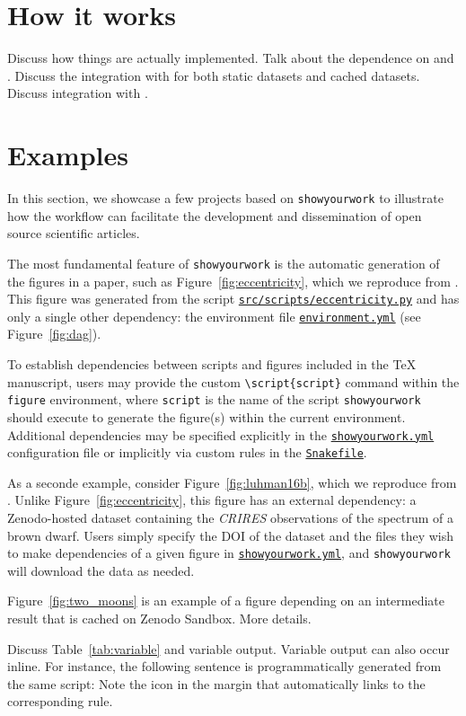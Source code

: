 \documentclass{aastex631}
\newcommand\xxx[1]{{\color{red}#1}}
\newcommand\syw{\texttt{showyourwork}\xspace}
\newcommand\repoargurl{https://github.com/showyourwork/showyourwork-paper}
\newcommand\fileurl[1]{\repoargurl/blob/\GitHubSHA/#1}
\newcommand\repoargfile[1]{\href{\fileurl{#1}}{\texttt{#1}\xspace}}
\newcommand\figenv{\texttt{figure}\xspace}
\newcommand\scriptcmd{\texttt{\textbackslash script\{{\color{lsthilite}script}\}}\xspace}
\newcommand\scriptarg{\texttt{\color{lsthilite}script}\xspace}
\begin{document}
\section{How it works}
\label{sec:how-it-works}
\xxx{Discuss how things are actually implemented. Talk about the dependence on \snakemake \citep{Molder2021} and \tectonic. Discuss the integration with \Zenodo for both static datasets and cached datasets. Discuss integration with \Overleaf.}

\section{Examples}
\label{sec:examples}
In this section, we showcase a few projects based on \syw to illustrate how the workflow can facilitate the development and dissemination of open source scientific articles.

The most fundamental feature of \syw is the automatic generation of the figures in a paper, such as Figure~\ref{fig:eccentricity}, which we reproduce from \citet{Wagg2022}.
This figure was generated from the script \repoargfile{src/scripts/eccentricity.py} and has only a single other dependency: the \conda environment file \repoargfile{environment.yml} (see Figure~\ref{fig:dag}).

To establish dependencies between scripts and figures included in the TeX manuscript, users may provide the custom \scriptcmd command within the \figenv environment, where \scriptarg is the name of the script \syw should execute to generate the figure(s) within the current environment.
Additional dependencies may be specified explicitly in the \repoargfile{showyourwork.yml} configuration file or implicitly via custom rules in the \repoargfile{Snakefile}.

As a seconde example, consider Figure~\ref{fig:luhman16b}, which we reproduce from \citet{Luger2021c}. 
Unlike Figure~\ref{fig:eccentricity}, this figure has an external dependency: a Zenodo-hosted dataset containing the \emph{CRIRES} observations of the spectrum of a brown dwarf.
Users simply specify the DOI of the dataset and the files they wish to make dependencies of a given figure in \repoargfile{showyourwork.yml}, and \syw will download the data as needed.

Figure~\ref{fig:two_moons} is an example of a figure depending on an intermediate result that is cached on Zenodo Sandbox.
\xxx{More details.}

\xxx{Discuss Table~\ref{tab:variable} and variable output.}
Variable output can also occur inline. For instance, the following sentence is programmatically generated from the same script:  Note the icon in the margin that automatically links to the corresponding \snakemake rule.
\end{document}
